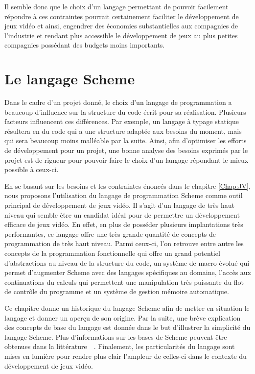 \documentclass[12pt,oneside,letterpaper,francais]{book}
\begin{document}
Il semble donc que le choix d'un langage permettant de pouvoir
facilement répondre à ces contraintes pourrait certainement faciliter
le développement de jeux vidéo et ainsi, engendrer des économies
substantielles aux compagnies de l'industrie et rendant plus
accessible le développement de jeux au plus petites compagnies
possédant des budgets moins importants.




\chapter{Le langage Scheme}
\label{Chap:Scheme}

Dans le cadre d'un projet donné, le choix d'un langage de
programmation a beaucoup d'influence sur la structure du code écrit
pour sa réalisation. Plusieurs facteurs influencent ces
différences. Par exemple, un langage à typage statique résultera en du
code qui a une structure adaptée aux besoins du moment, mais qui sera
beaucoup moins malléable par la suite. Ainsi, afin d'optimiser les
efforts de développement pour un projet, une bonne analyse des besoins
exprimés par le projet est de rigueur pour pouvoir faire le choix d'un
langage répondant le mieux possible à ceux-ci.

En se basant sur les besoins et les contraintes énoncés dans le
chapitre \ref{Chap:JV}, nous proposons l'utilisation du langage de
programmation Scheme comme outil principal de développement de jeux
vidéo. Il s'agit d'un langage de très haut niveau qui semble être un
candidat idéal pour de permettre un développement efficace de jeux
vidéo. En effet, en plus de posséder plusieurs implantations très
performantes, ce langage offre une très grande quantité de concepts de
programmation de très haut niveau. Parmi ceux-ci, l'on retrouve entre
autre les concepts de la programmation fonctionnelle qui offre un
grand potentiel d'abstractions au niveau de la structure du code, un
système de macro évolué qui permet d'augmenter Scheme avec des
langages spécifiques au domaine, l'accès aux continuations du calculs
qui permettent une manipulation très puissante du flot de contrôle du
programme et un système de gestion mémoire automatique.

Ce chapitre donne un historique du langage Scheme afin de mettre en
situation le langage et donner un aperçu de son origine. Par la suite,
une brève explication des concepts de base du langage est donnée dans
le but d'illustrer la simplicité du langage Scheme. Plus
d'informations sur les bases de Scheme peuvent être obtenues dans la
littérature~\cite{R5RS}~\cite{SICP}. Finalement, les particularités du
langage sont mises en lumière pour rendre plus clair l'ampleur de
celles-ci dans le contexte du développement de jeux vidéo.
\end{document}
